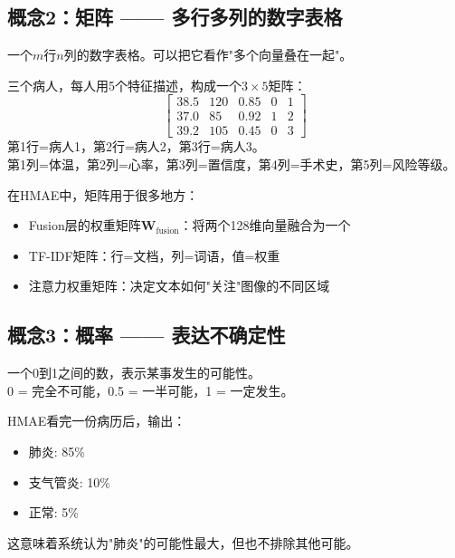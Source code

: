 \documentclass[11pt,a4paper]{ctexart}
\begin{document}
\subsection{概念2：矩阵 —— 多行多列的数字表格}

\begin{defbox}[矩阵 (Matrix)]
一个$m$行$n$列的数字表格。可以把它看作"多个向量叠在一起"。
\end{defbox}

\begin{exambox}[例子：病人数据矩阵]
三个病人，每人用5个特征描述，构成一个$3 \times 5$矩阵：
$$
\begin{bmatrix}
38.5 & 120 & 0.85 & 0 & 1 \\
37.0 & 85  & 0.92 & 1 & 2 \\
39.2 & 105 & 0.45 & 0 & 3
\end{bmatrix}
$$
第1行=病人1，第2行=病人2，第3行=病人3。\\
第1列=体温，第2列=心率，第3列=置信度，第4列=手术史，第5列=风险等级。
\end{exambox}

在HMAE中，矩阵用于很多地方：
\begin{itemize}[nosep]
\item Fusion层的权重矩阵$\mathbf{W}_{\text{fusion}}$：将两个128维向量融合为一个
\item TF-IDF矩阵：行=文档，列=词语，值=权重
\item 注意力权重矩阵：决定文本如何"关注"图像的不同区域
\end{itemize}

\subsection{概念3：概率 —— 表达不确定性}

\begin{defbox}[概率 (Probability)]
一个0到1之间的数，表示某事发生的可能性。\\
0 = 完全不可能，0.5 = 一半可能，1 = 一定发生。
\end{defbox}

\begin{exambox}[例子：诊断概率]
HMAE看完一份病历后，输出：
\begin{itemize}[nosep]
\item 肺炎: 85\%
\item 支气管炎: 10\%
\item 正常: 5\%
\end{itemize}
这意味着系统认为"肺炎"的可能性最大，但也不排除其他可能。
\end{exambox}
\end{document}
